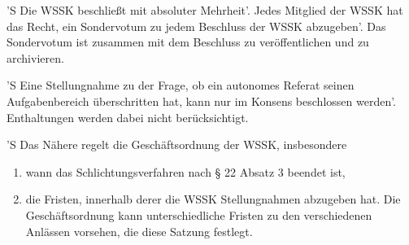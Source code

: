 \documentclass[fontsize=12pt,parskip=half]{scrartcl}
\begin{document}
\begin{contract}

  'S Die WSSK beschließt mit absoluter Mehrheit'. Jedes Mitglied der WSSK hat das
  Recht, ein Sondervotum zu jedem Beschluss der WSSK abzugeben'. Das Sondervotum
  ist zusammen mit dem Beschluss zu veröffentlichen und zu archivieren.

  'S Eine Stellungnahme zu der Frage, ob ein autonomes Referat seinen
  Aufgabenbereich überschritten hat, kann nur im Konsens beschlossen werden'.
  Enthaltungen werden dabei nicht berücksichtigt.

  'S Das Nähere regelt die Geschäftsordnung der WSSK, insbesondere
  \begin{enumerate}[\qquad 1.]
  \item wann das Schlichtungsverfahren nach § 22 Absatz 3 beendet ist,
  \item die Fristen, innerhalb derer die WSSK Stellungnahmen abzugeben hat. Die
    Geschäftsordnung kann unterschiedliche Fristen zu den verschiedenen Anlässen
    vorsehen, die diese Satzung festlegt.
  \end{enumerate}

\end{contract}
\end{document}
